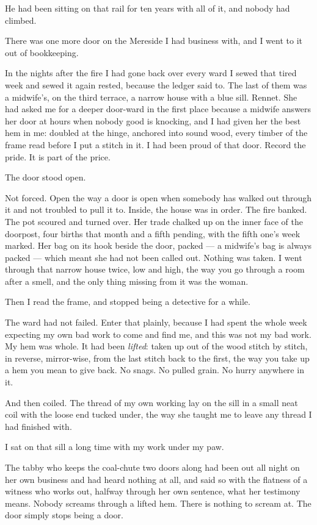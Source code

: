 He had been sitting on that rail for ten years with all of it, and nobody had climbed.

\scenebreak

There was one more door on the Mereside I had business with, and I went to it out of bookkeeping.

In the nights after the fire I had gone back over every ward I sewed that tired week and sewed it again rested, because the ledger said to. The last of them was a midwife's, on the third terrace, a narrow house with a blue sill. Rennet. She had asked me for a deeper door-ward in the first place because a midwife answers her door at hours when nobody good is knocking, and I had given her the best hem in me: doubled at the hinge, anchored into sound wood, every timber of the frame read before I put a stitch in it. I had been proud of that door. Record the pride. It is part of the price.

The door stood open.

Not forced. Open the way a door is open when somebody has walked out through it and not troubled to pull it to. Inside, the house was in order. The fire banked. The pot scoured and turned over. Her trade chalked up on the inner face of the doorpost, four births that month and a fifth pending, with the fifth one's week marked. Her bag on its hook beside the door, packed --- a midwife's bag is always packed --- which meant she had not been called out. Nothing was taken. I went through that narrow house twice, low and high, the way you go through a room after a smell, and the only thing missing from it was the woman.

Then I read the frame, and stopped being a detective for a while.

The ward had not failed. Enter that plainly, because I had spent the whole week expecting my own bad work to come and find me, and this was not my bad work. My hem was whole. It had been \emph{lifted}: taken up out of the wood stitch by stitch, in reverse, mirror-wise, from the last stitch back to the first, the way you take up a hem you mean to give back. No snags. No pulled grain. No hurry anywhere in it.

And then coiled. The thread of my own working lay on the sill in a small neat coil with the loose end tucked under, the way she taught me to leave any thread I had finished with.

I sat on that sill a long time with my work under my paw.

The tabby who keeps the coal-chute two doors along had been out all night on her own business and had heard nothing at all, and said so with the flatness of a witness who works out, halfway through her own sentence, what her testimony means. Nobody screams through a lifted hem. There is nothing to scream at. The door simply stops being a door.

